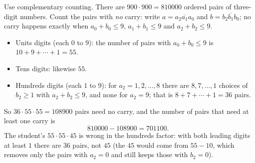 Use complementary counting. There are $900\cdot900=810000$ ordered pairs of three-digit numbers. Count the pairs with \emph{no} carry: write $a=\overline{a_2a_1a_0}$ and $b=\overline{b_2b_1b_0}$; no carry happens exactly when $a_0+b_0\le9$, $a_1+b_1\le9$ and $a_2+b_2\le9$.
\begin{itemize}
\item Units digits (each $0$ to $9$): the number of pairs with $a_0+b_0\le9$ is $10+9+\cdots+1=55$.
\item Tens digits: likewise $55$.
\item Hundreds digits (each $1$ to $9$): for $a_2=1,2,\dots,8$ there are $8,7,\dots,1$ choices of $b_2\ge1$ with $a_2+b_2\le9$, and none for $a_2=9$; that is $8+7+\cdots+1=36$ pairs.
\end{itemize}
So $36\cdot55\cdot55=108900$ pairs need no carry, and the number of pairs that need at least one carry is
\[
810000-108900=\boxed{701100}.
\]
The student's $55\cdot55\cdot45$ is wrong in the hundreds factor: with both leading digits at least $1$ there are $36$ pairs, not $45$ (the $45$ would come from $55-10$, which removes only the pairs with $a_2=0$ and still keeps those with $b_2=0$).
